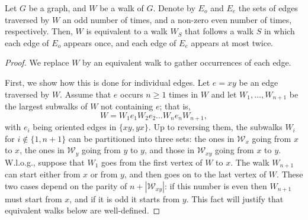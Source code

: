 \documentclass[a4paper,11pt,dvipsnames]{elsarticle}
\begin{document}
\begin{proposition}\label{proposition:walk_shapes}
  Let $G$ be a graph, and $W$ be a walk of $G$. Denote by $E_o$ and $E_e$ the sets of edges traversed by $W$
  an odd number of times, and a non-zero even number of times, respectively. Then, $W$ is equivalent to a walk $W_S$ that follows a walk $S$ in which each edge of $E_o$ appears once, and each edge of $E_e$ appears at most twice.
\end{proposition}
\begin{proof}
  We replace $W$ by an equivalent walk to gather occurrences of each edge.
  
  First, we show how this is done for individual edges.
  Let $e=xy$ be an edge traversed by $W$. Assume that $e$ occurs $n\ge 1$
  times in $W$ and let $W_1,\dots,W_{n+1}$ be the largest subwalks of $W$ not containing $e$; that is,
  \[
    W=W_1e_1W_2e_2\dots W_ne_nW_{n+1},
  \]
  with $e_i$ being oriented edges in $\{xy,yx\}$. Up to reversing them, the subwalks $W_i$ for $i\notin\{1,n+1\}$ can be partitioned into three sets:
  the ones in $\mathcal{W}_x$ going from $x$ to $x$, the ones in $\mathcal{W}_y$ going from $y$ to $y$, and those in $\mathcal{W}_{xy}$
  going from $x$ to $y$. W.l.o.g., suppose that $W_1$ goes from the first vertex of $W$ to $x$. The walk $W_{n+1}$ can start either from $x$ or from $y$, and then goes on to the last vertex of $W$. These two cases depend on the parity of $n+|\mathcal W_{xy}|$: if this number is even then $W_{n+1}$ must start from $x$, and if it is odd it starts from $y$. This fact will justify that equivalent walks below are well-defined.
  

\end{proof}
\end{document}
